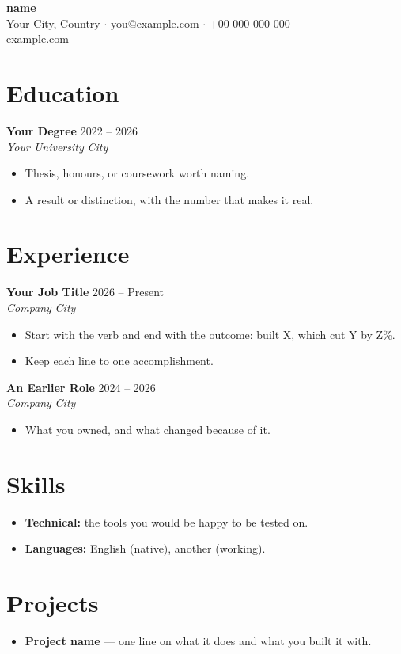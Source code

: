\documentclass[11pt,a4paper]{article}
\newcommand{\entry}[4]{%
    \textbf{#1} \hfill #2 \\
    \textit{#3} \hfill \textit{#4} \\[0.2em]
}
\begin{document}
\begin{center}
    {\LARGE\bfseries {name}} \\[0.4em]
    Your City, Country $\cdot$ you@example.com $\cdot$ +00 000 000 000 \\
    \href{https://example.com}{example.com}
\end{center}

\section{Education}

\entry{Your Degree}{2022 -- 2026}{Your University}{City}
\begin{itemize}[leftmargin=*, itemsep=0.1em]
    \item Thesis, honours, or coursework worth naming.
    \item A result or distinction, with the number that makes it real.
\end{itemize}

\section{Experience}

\entry{Your Job Title}{2026 -- Present}{Company}{City}
\begin{itemize}[leftmargin=*, itemsep=0.1em]
    \item Start with the verb and end with the outcome: built X, which
          cut Y by Z\%.
    \item Keep each line to one accomplishment.
\end{itemize}

\entry{An Earlier Role}{2024 -- 2026}{Company}{City}
\begin{itemize}[leftmargin=*, itemsep=0.1em]
    \item What you owned, and what changed because of it.
\end{itemize}

\section{Skills}

\begin{itemize}[leftmargin=*, itemsep=0.1em]
    \item \textbf{Technical:} the tools you would be happy to be tested on.
    \item \textbf{Languages:} English (native), another (working).
\end{itemize}

\section{Projects}

\begin{itemize}[leftmargin=*, itemsep=0.1em]
    \item \textbf{Project name} --- one line on what it does and what
          you built it with.
\end{itemize}
\end{document}
